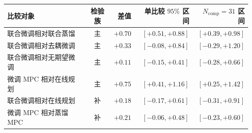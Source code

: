 \begin{table}[!htbp]
\centering
{}
\label{tab:ch5-dynamic-effects}
\begin{tabular}{lcrrr}
\toprule
比较对象 & 检验族 & 差值 & 单比较 $95\%$ 区间 & $N_{\mathrm{comp}}=31$ 区间 \\
\midrule
联合微调相对联合蒸馏 & 主 & $+0.70$ & $[+0.51, +0.88]$ & $[+0.39, +0.98]$ \\
联合微调相对去耦微调 & 主 & $+0.33$ & $[-0.08, +0.84]$ & $[-0.29, +1.20]$ \\
联合微调相对无期望微调 & 主 & $+0.11$ & $[-0.15, +0.41]$ & $[-0.28, +0.66]$ \\
微调 MPC 相对在线规划 & 主 & $+0.75$ & $[+0.41, +1.16]$ & $[+0.25, +1.42]$ \\
联合微调相对在线规划 & 补 & $+0.18$ & $[-0.17, +0.61]$ & $[-0.31, +0.91]$ \\
微调 MPC 相对蒸馏 MPC & 补 & $+0.21$ & $[-0.06, +0.48]$ & $[-0.23, +0.60]$ \\
\bottomrule
\end{tabular}
\end{table}
